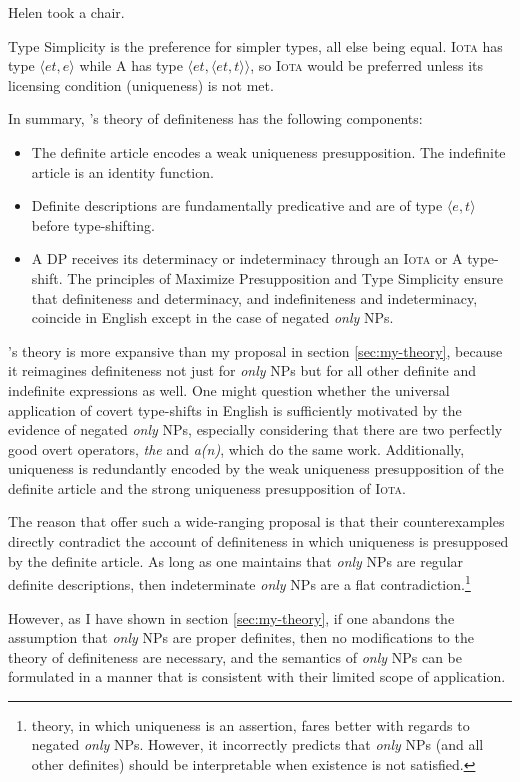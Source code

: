 \begin{exe}
	\ex \label{helen} Helen took a chair.
\end{exe}

Type Simplicity is the preference for simpler types, all else being equal. \textsc{Iota} has type $\langle et, e \rangle$ while \textsc{A} has type $\langle et, \langle et, t \rangle \rangle$, so \textsc{Iota} would be preferred unless its licensing condition (uniqueness) is not met.

In summary, \citeauthor{cb2015}'s theory of definiteness has the following components:

\begin{itemize}
	\item The definite article encodes a weak uniqueness presupposition. The indefinite article is an identity function.
	\item Definite descriptions are fundamentally predicative and are of type $\langle e, t \rangle$ before type-shifting.
	\item A DP receives its determinacy or indeterminacy through an \textsc{Iota} or \textsc{A} type-shift. The principles of Maximize Presupposition and Type Simplicity ensure that definiteness and determinacy, and indefiniteness and indeterminacy, coincide in English except in the case of negated \textit{only} NPs.
\end{itemize}

\citeauthor{cb2015}'s theory is more expansive than my proposal in section \ref{sec:my-theory}, because it reimagines definiteness not just for \textit{only} NPs but for all other definite and indefinite expressions as well. One might question whether the universal application of covert type-shifts in English is sufficiently motivated by the evidence of negated \textit{only} NPs, especially considering that there are two perfectly good overt operators, \textit{the} and \textit{a(n)}, which do the same work. Additionally, uniqueness is redundantly encoded by the weak uniqueness presupposition of the definite article and the strong uniqueness presupposition of \textsc{Iota}.

The reason that \citeauthor{cb2015} offer such a wide-ranging proposal is that their counterexamples directly contradict the account of definiteness in which uniqueness is presupposed by the definite article. As long as one maintains that \textit{only} NPs are regular definite descriptions, then indeterminate \textit{only} NPs are a flat contradiction.\footnote{ theory, in which uniqueness is an assertion, fares better with regards to negated \textit{only} NPs. However, it incorrectly predicts that \textit{only} NPs (and all other definites) should be interpretable when existence is not satisfied.}

However, as I have shown in section \ref{sec:my-theory}, if one abandons the assumption that \textit{only} NPs are proper definites, then no modifications to the theory of definiteness are necessary, and the semantics of \textit{only} NPs can be formulated in a manner that is consistent with their limited scope of application.